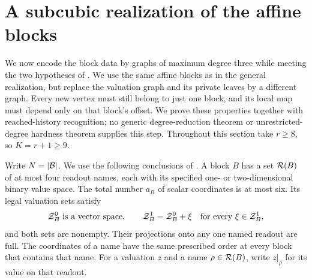 \section{A subcubic realization of the affine blocks}
\label{graph:section}

We now encode the block data by graphs of maximum degree three while
meeting the two hypotheses of .
We use the same affine blocks as in the general realization, but replace
the valuation graph and its private leaves by a different graph. Every
new vertex must still belong to just one block, and its local map must
depend only on that block's offset. We prove these properties together
with reached-history recognition; no generic degree-reduction theorem
or unrestricted-degree hardness theorem supplies this step.
Throughout this section take \(r\ge8\), so \(K=r+1\ge9\).

Write \(N=\lvert\mathcal B\rvert\).  We use the following conclusions of
.  A block \(B\) has a set \(\mathcal R(B)\) of at most four
readout names, each with its specified one- or two-dimensional binary
value space.  The total number \(a_B\) of scalar coordinates is at most
six.  Its legal valuation sets satisfy
\[
  \mathcal Z_B^0\text{ is a vector space},\qquad
  \mathcal Z_B^1=\mathcal Z_B^0+\xi
       \quad\text{for every }\xi\in\mathcal Z_B^1,
\]
and both sets are nonempty.  Their projections onto any one named
readout are full.  The coordinates of a name have the same prescribed
order at every block that contains that name.  For a valuation \(z\)
and a name \(\rho\in\mathcal R(B)\), write \(z|_\rho\) for its value on that
readout.

